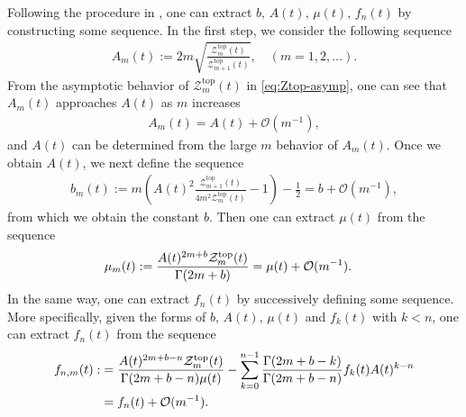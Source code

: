 \documentclass[11pt]{article}
\newcommand{\Ztop}{\mathcal{Z}^{\text{top}}}
\renewcommand{\[}{\begin{eqnarray}}
\renewcommand{\]}{\end{eqnarray}}
\newcommand{\Atop}{A}
\newcommand{\btop}{b}
\newcommand{\ftop}{f}
\newcommand{\mutop}{\mu}
\begin{document}
Following the procedure in \cite{Marino:2007te},
one can extract $\btop,\, \Atop(t),\,\mutop(t),\,\ftop_n(t)$
by constructing some sequence.
In the first step, we consider the following sequence
%
\begin{align}
 \Atop_m(t):=2m\sqrt{\frac{\Ztop_m(t)}{\Ztop_{m+1}(t)}},\quad (m=1,2,\ldots).
\label{eq:A-seq}
\end{align}
From the asymptotic behavior of $\Ztop_m(t)$ in \eqref{eq:Ztop-asymp},
one can see that $\Atop_m(t)$ approaches $\Atop(t)$ as $m$ increases
\begin{equation}
\begin{aligned}
 \Atop_m(t)=A(t)+\mathcal{O}(m^{-1}),
\end{aligned} 
\end{equation}
and $A(t)$ can be determined from
the large $m$ behavior of $\Atop_m(t)$.
Once we obtain $\Atop(t)$, we next define
the sequence
%
\begin{align}
 \btop_m(t):=
 m\left(\Atop(t)^2\frac{\Ztop_{m+1}(t)}{4m^2\Ztop_m(t)}-1\right)
 -\frac{1}{2}=b+\mathcal{O}(m^{-1}),
\label{eq:b-seq}
\end{align}
%
from which we obtain the constant $\btop$.
%
Then one can extract $\mutop(t)$ 
from the sequence
%
\begin{align}
\mu_m(t):=\frac{\Atop(t)^{2m+\btop}\Ztop_m(t)}{\Gamma(2m+\btop)}
 &=\mutop(t)+{\cal O}(m^{-1}).
\end{align}
%
In the same way,
one can  extract $\ftop_n(t)$ by successively defining some sequence.
More specifically, given the forms of $\btop,\, \Atop(t),\,\mutop(t)$
and $\ftop_k(t)$ with $k<n$, one can extract $\ftop_n(t)$
from the sequence
%
\begin{equation}
\begin{aligned}
f_{n,m}(t):&=\frac{\Atop(t)^{2m+b-n}\Ztop_m(t)}{\Gamma(2m+b-n)\mutop(t)}
-\sum_{k=0}^{n-1}\frac{\Gamma(2m+b-k)}{\Gamma(2m+b-n)}
                 \ftop_k(t)\Atop(t)^{k-n}\\
&=f_n(t)+{\cal O}(m^{-1}). 
\end{aligned} 
\label{eq:muf-seq}
\end{equation}
\end{document}
